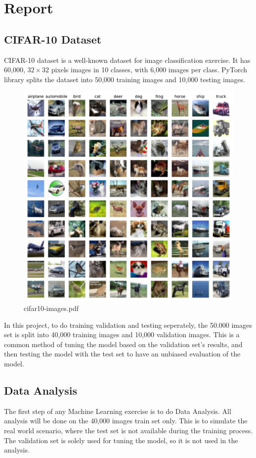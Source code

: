 \documentclass{report}
\begin{document}
\chapter*{Report}

\section{CIFAR-10 Dataset}
CIFAR-10 dataset is a well-known dataset for image classification exercise. It has 60,000, $32\times32$ pixels images 
in 10 classes, with 6,000 images per class. PyTorch library splits the dataset into 50,000 training images and 
10,000 testing images. 

\begin{figure}[ht]
    \center
    \includegraphics[scale=0.7]{../output/cifar10-images.pdf}
    \caption{cifar10-images.pdf}
\end{figure}

In this project, to do training validation and testing seperately, the 50.000 images set is split into 40,000 
training images and 10,000 validation images. This is a common method of tuning the model based on the validation 
set's results, and then testing the model with the test set to have an unbiased evaluation of the model.

\section{Data Analysis}
The first step of any Machine Learning exercise is to do Data Analysis. All analysis will be done on the 40,000 
images train set only. This is to simulate the real world scenario, where the test set is not available during the 
training process. The validation set is solely used for tuning the model, so it is not used in the analysis.
\end{document}
